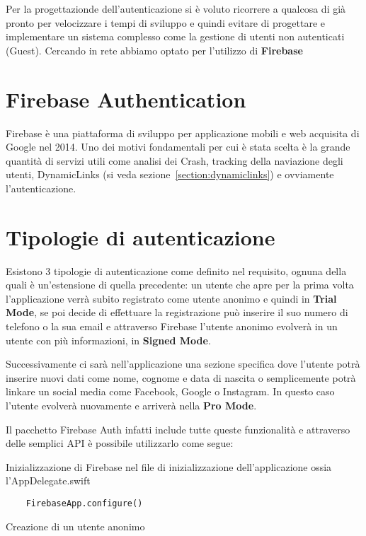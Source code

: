 
Per la progettazionde dell'autenticazione si è voluto ricorrere a qualcosa di 
già pronto per velocizzare i tempi di sviluppo e quindi evitare di progettare e implementare un sistema 
complesso come la gestione di utenti non autenticati (Guest).
Cercando in rete abbiamo optato per l'utilizzo di \textbf{Firebase}\cite{firebase}

\section{Firebase Authentication}

Firebase è una piattaforma
di sviluppo per applicazione mobili e web acquisita di Google nel 2014. 
Uno dei motivi fondamentali per cui è stata scelta è la grande quantità di servizi utili come
analisi dei Crash, tracking della naviazione degli utenti, DynamicLinks (si veda sezione~\ref{section:dynamiclinks})
e ovviamente l'autenticazione.

\section{Tipologie di autenticazione}

Esistono 3 tipologie di autenticazione come definito nel requisito, ognuna della quali è un'estensione
di quella precedente: un utente che apre per la prima volta l'applicazione verrà subito registrato 
come utente anonimo e quindi in \textbf{Trial Mode}, se poi decide di effettuare la registrazione può inserire 
il suo numero di telefono o la sua email e attraverso Firebase l'utente anonimo evolverà in un utente con più
informazioni, in \textbf{Signed Mode}.

Successivamente ci sarà nell'applicazione una sezione specifica dove l'utente potrà inserire nuovi dati come nome, cognome e data di nascita
o semplicemente potrà linkare un social media come Facebook, Google o Instagram. In questo caso l'utente evolverà nuovamente 
e arriverà nella \textbf{Pro Mode}.

Il pacchetto Firebase Auth infatti include tutte queste funzionalità e attraverso delle semplici API
è possibile utilizzarlo come segue:

Inizializzazione di Firebase nel file di inizializzazione dell'applicazione ossia l'AppDelegate.swift

\begin{verbatim}
    FirebaseApp.configure()
\end{verbatim}

Creazione di un utente anonimo

